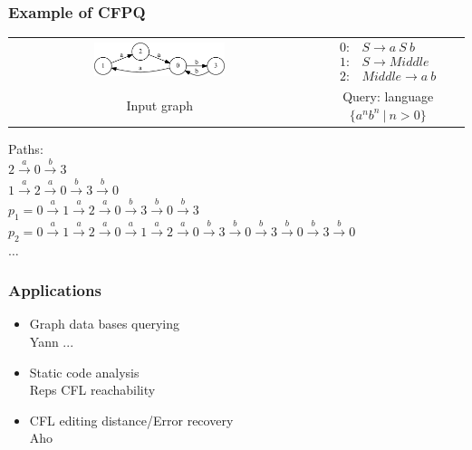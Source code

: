 \documentclass[xcolor=table]{beamer}
\begin{document}
\begin{frame} \frametitle{Example of CFPQ}

\begin{center}
  \begin{tabular}{  c  c  }
      \includegraphics[width=0.45\textwidth]{pictures/input.pdf}
      &
  $

  \begin{array}{rl}
     0:& S \rightarrow a \ S \ b \\
     1:& S \rightarrow Middle \\
     2:& Middle \rightarrow a \ b
  \end{array}

  $
  \\
  Input graph
  &
  Query: language $\{a^nb^n \ | \ n > 0 \}$

  \end{tabular}
\end{center}
\vspace{0.5cm}
Paths: \\
$2 \xrightarrow{a} 0 \xrightarrow{b} 3$ \\
$1 \xrightarrow{a} 2 \xrightarrow{a} 0 \xrightarrow{b} 3 \xrightarrow{b} 0$ \\
$p_1 = 0 \xrightarrow{a} 1 \xrightarrow{a} 2 \xrightarrow{a} 0 \xrightarrow{b} 3 \xrightarrow{b} 0 \xrightarrow{b} 3$ \\
$p_2 = 0 \xrightarrow{a} 1 \xrightarrow{a} 2 \xrightarrow{a} 0 \xrightarrow{a} 1 \xrightarrow{a} 2 \xrightarrow{a} 0 \xrightarrow{b} 3 \xrightarrow{b} 0 \xrightarrow{b} 3 \xrightarrow{b} 0 \xrightarrow{b} 3 \xrightarrow{b} 0$ \\
$\dots$

\end{frame}


\begin{frame} \frametitle{Applications}
\begin{itemize}
\item Graph data bases querying \\
Yann ...
\item Static code analysis \\
Reps CFL reachability
\item CFL editing distance/Error recovery \\
Aho
\end{itemize}
\end{frame}
\end{document}
